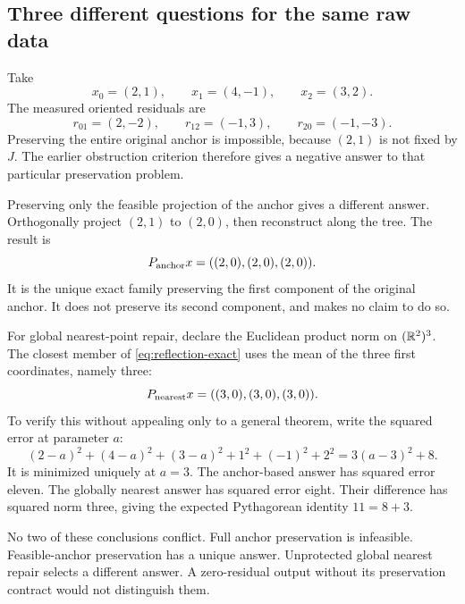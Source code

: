 
\subsection{Three different questions for the same raw data}
Take
\[
 x_0=(2,1),\qquad x_1=(4,-1),\qquad x_2=(3,2).
\]
The measured oriented residuals are
\[
 r_{01}=(2,-2),\qquad r_{12}=(-1,3),\qquad r_{20}=(-1,-3).
\]
Preserving the entire original anchor is impossible, because \((2,1)\) is not fixed by \(J\). The earlier obstruction criterion therefore gives a negative answer to that particular preservation problem.

Preserving only the feasible projection of the anchor gives a different answer. Orthogonally project \((2,1)\) to \((2,0)\), then reconstruct along the tree. The result is
\[
 P_{\rm anchor}x=((2,0),(2,0),(2,0)).
\]
It is the unique exact family preserving the first component of the original anchor. It does not preserve its second component, and makes no claim to do so.

For global nearest-point repair, declare the Euclidean product norm on \((\mathbb R^2)^3\). The closest member of \eqref{eq:reflection-exact} uses the mean of the three first coordinates, namely three:
\[
 P_{\rm nearest}x=((3,0),(3,0),(3,0)).
\]
To verify this without appealing only to a general theorem, write the squared error at parameter \(a\):
\[
 (2-a)^2+(4-a)^2+(3-a)^2+1^2+(-1)^2+2^2
 =3(a-3)^2+8.
\]
It is minimized uniquely at \(a=3\). The anchor-based answer has squared error eleven. The globally nearest answer has squared error eight. Their difference has squared norm three, giving the expected Pythagorean identity \(11=8+3\).

No two of these conclusions conflict. Full anchor preservation is infeasible. Feasible-anchor preservation has a unique answer. Unprotected global nearest repair selects a different answer. A zero-residual output without its preservation contract would not distinguish them.

